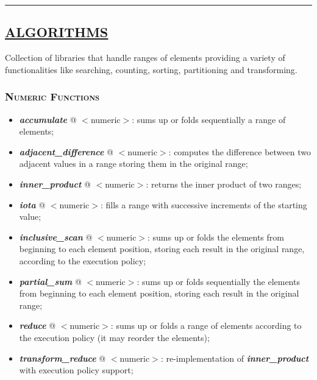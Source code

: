 \documentclass[10pt]{article}
\begin{document}
\begin{multicols*}{4}
\par\noindent\rule{197pt}{0.4pt}

{\color{Blue}
\subsection*{\href{https://en.cppreference.com/w/cpp/algorithm}{\underline{ALGORITHMS}}}	
\noindent  
Collection of libraries that handle ranges of elements providing a variety of functionalities like searching, counting, sorting, partitioning and transforming.


\subsubsection*{\textsc{Numeric Functions}} 
\begin{itemize}[leftmargin=*,topsep=0.25pt]
  \setlength\itemsep{-1.8pt}
	\item  \emph{\textbf{accumulate}} @ $<$numeric$>$: sums up or folds sequentially a range of elements;
		\item  \emph{\textbf{adjacent\_difference}} @ $<$numeric$>$: computes the difference between two adjacent values in a range storing them in the original range;
	\item  \emph{\textbf{inner\_product}} @ $<$numeric$>$: returns the inner product of two ranges;
	\item  \emph{\textbf{iota}} @ $<$numeric$>$: fills a range with successive increments of the starting value;
	\item  \emph{\textbf{inclusive\_scan}} @ $<$numeric$>$: sums up or folds the elements from beginning to each element position, storing each result in the original range, according to the execution policy;
	\item  \emph{\textbf{partial\_sum}} @ $<$numeric$>$: sums up or folds sequentially the elements from beginning to each element position, storing each result in the original range;
\item  \emph{\textbf{reduce}} @ $<$numeric$>$: sums up or folds a range of elements according to the execution policy (it may reorder the elements);
	\item  \emph{\textbf{transform\_reduce}} @ $<$numeric$>$: re-implementation of \emph{\textbf{inner\_product}} with execution policy support;
	\end{itemize}


}
\end{multicols*}
\end{document}
